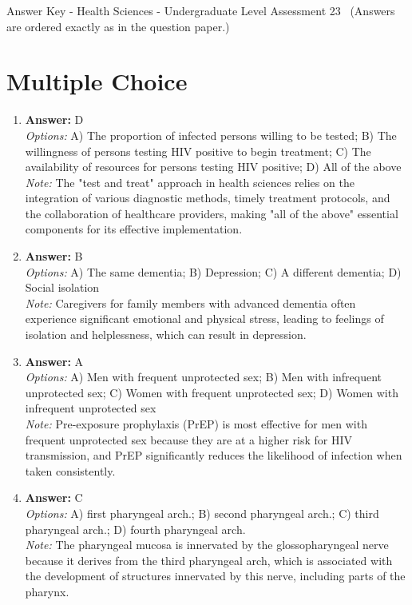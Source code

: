 \documentclass[12pt]{article}
\begin{document}
\begin{center}
Answer Key - Health Sciences - Undergraduate Level Assessment 23 \
\small (Answers are ordered exactly as in the question paper.)
\end{center}

\section*{Multiple Choice}
\begin{enumerate}[label=\arabic*.]
\item \textbf{Answer:} D
\\ \textit{Options:} A) The proportion of infected persons willing to be tested; B) The willingness of persons testing HIV positive to begin treatment; C) The availability of resources for persons testing HIV positive; D) All of the above
\\ \textit{Note:} The "test and treat" approach in health sciences relies on the integration of various diagnostic methods, timely treatment protocols, and the collaboration of healthcare providers, making "all of the above" essential components for its effective implementation.
\item \textbf{Answer:} B
\\ \textit{Options:} A) The same dementia; B) Depression; C) A different dementia; D) Social isolation
\\ \textit{Note:} Caregivers for family members with advanced dementia often experience significant emotional and physical stress, leading to feelings of isolation and helplessness, which can result in depression.
\item \textbf{Answer:} A
\\ \textit{Options:} A) Men with frequent unprotected sex; B) Men with infrequent unprotected sex; C) Women with frequent unprotected sex; D) Women with infrequent unprotected sex
\\ \textit{Note:} Pre-exposure prophylaxis (PrEP) is most effective for men with frequent unprotected sex because they are at a higher risk for HIV transmission, and PrEP significantly reduces the likelihood of infection when taken consistently.
\item \textbf{Answer:} C
\\ \textit{Options:} A) first pharyngeal arch.; B) second pharyngeal arch.; C) third pharyngeal arch.; D) fourth pharyngeal arch.
\\ \textit{Note:} The pharyngeal mucosa is innervated by the glossopharyngeal nerve because it derives from the third pharyngeal arch, which is associated with the development of structures innervated by this nerve, including parts of the pharynx.

\end{enumerate}
\end{document}
